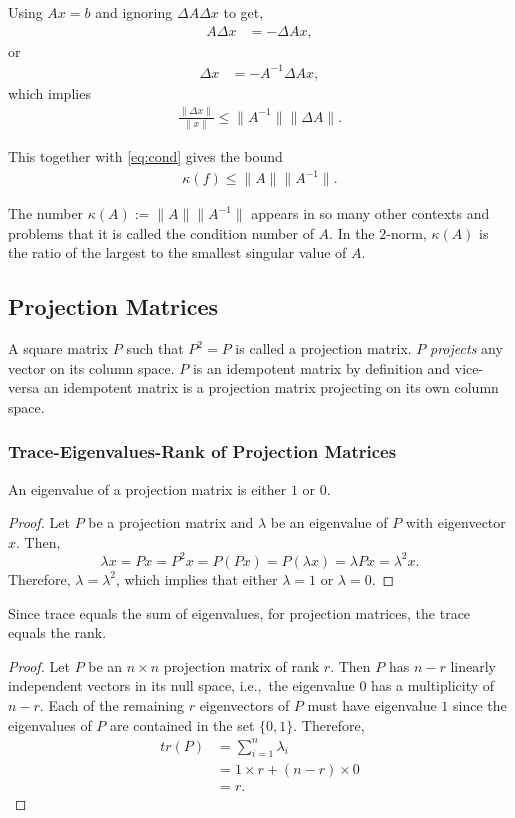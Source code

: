 \documentclass{amsart}
\theoremstyle{plain}
\numberwithin{equation}{section}
\begin{document}
Using $Ax=b$ and ignoring $\Delta A \Delta x$ to get,
\begin{align*}
A \Delta x  &= - \Delta A x,
\end{align*}
or
\begin{align*}
\Delta x &= - A^{-1} \Delta A x,
\end{align*}
which implies
\begin{align*}
\frac{\| \Delta x \|}{\| x \|} \leq \| A^{-1} \| \| \Delta A \| .
\end{align*}

This together with \eqref{eq:cond} gives the bound
\begin{align*}
\kappa(f) \leq \|A\| \|A^{-1}\|.
\end{align*}

The number $\kappa(A) := \|A\| \|A^{-1}\|$ appears in so many other 
contexts and problems that it is called the condition number of $A$.
In the $2$-norm, $\kappa(A)$ is the ratio of the largest to the smallest
singular value of $A$.

\subsection*{Projection Matrices}
A square matrix $P$ such that $P^2=P$ is called
a projection matrix. $P$ \emph{projects} any 
vector on its column space. $P$ is an idempotent
matrix by definition and vice-versa an 
idempotent matrix is a projection matrix
projecting on its own column space.

\subsubsection*{Trace-Eigenvalues-Rank of Projection Matrices}
An eigenvalue of a projection matrix is 
either $1$ or $0$. 

\begin{proof}
Let $P$ be a projection matrix and
$\lambda$ be an eigenvalue of $P$
with eigenvector $x$. Then,
\begin{equation}
\lambda x = P x= P^2x = P (Px) = P(\lambda x) = \lambda P x = \lambda^2 x.
\end{equation}
Therefore, $\lambda = \lambda^2$, which implies that either $\lambda = 1$ or 
$\lambda = 0$. 
\end{proof}

Since trace equals the sum of eigenvalues, for projection matrices, the trace equals
the rank. 

\begin{proof}
Let $P$ be an $n \times n$ projection matrix of rank $r$. Then
$P$ has $n-r$ linearly independent vectors in its null space, i.e.,\
the eigenvalue $0$ has a multiplicity of $n-r$. Each of the remaining
$r$ eigenvectors of $P$ must have eigenvalue $1$ since the eigenvalues 
of $P$ are contained in the set $\{0, 1\}$. Therefore,  
\begin{align*}
tr(P) &= \sum_{i=1}^n \lambda_i \\
&= 1 \times r  + (n-r) \times 0 \\
&= r.
\end{align*}
\end{proof}
\end{document}
